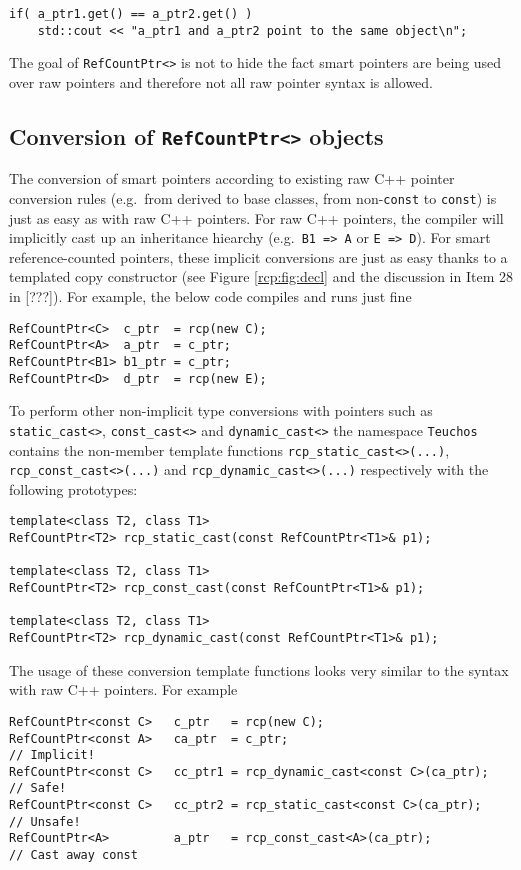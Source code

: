{\scriptsize\begin{verbatim}
if( a_ptr1.get() == a_ptr2.get() )
    std::cout << "a_ptr1 and a_ptr2 point to the same object\n";
\end{verbatim}}

The goal of \texttt{RefCountPtr<>} is not to hide the fact smart
pointers are being used over raw pointers and therefore not all raw
pointer syntax is allowed.

%
\subsection{Conversion of \texttt{RefCountPtr<>} objects}
%

The conversion of smart pointers according to existing raw C++ pointer
conversion rules (e.g.~from derived to base classes, from
non-\texttt{const} to \texttt{const}) is just as easy as with raw C++
pointers.  For raw C++ pointers, the compiler will implicitly cast up
an inheritance hiearchy (e.g.~\texttt{B1 => A} or \texttt{E => D}).
For smart reference-counted pointers, these implicit conversions are
just as easy thanks to a templated copy constructor (see Figure
\ref{rcp:fig:decl} and the discussion in Item 28 in [???]).  For
example, the below code compiles and runs just fine
%
{\scriptsize\begin{verbatim}
RefCountPtr<C>  c_ptr  = rcp(new C);
RefCountPtr<A>  a_ptr  = c_ptr;
RefCountPtr<B1> b1_ptr = c_ptr;
RefCountPtr<D>  d_ptr  = rcp(new E);
\end{verbatim}}
%
To perform other non-implicit type conversions with pointers such as
\texttt{static\-\_cast<>}, \texttt{const\-\_cast<>} and
\texttt{dynamic\-\_cast<>} the namespace \texttt{Teuchos} contains the
non-member template functions \texttt{rcp\-\_static\-\_cast<>(...)},
\texttt{rcp\-\_const\-\_cast<>(...)} and
\texttt{rcp\-\_dynamic\-\_cast<>(...)} respectively with the following
prototypes:
%
{\scriptsize\begin{verbatim}
template<class T2, class T1>
RefCountPtr<T2> rcp_static_cast(const RefCountPtr<T1>& p1);

template<class T2, class T1>
RefCountPtr<T2> rcp_const_cast(const RefCountPtr<T1>& p1);

template<class T2, class T1>
RefCountPtr<T2> rcp_dynamic_cast(const RefCountPtr<T1>& p1);
\end{verbatim}}
%
The usage of these conversion template functions looks very similar to
the syntax with raw C++ pointers.  For example
%
{\scriptsize\begin{verbatim}
RefCountPtr<const C>   c_ptr   = rcp(new C);
RefCountPtr<const A>   ca_ptr  = c_ptr;                              // Implicit!
RefCountPtr<const C>   cc_ptr1 = rcp_dynamic_cast<const C>(ca_ptr);  // Safe!
RefCountPtr<const C>   cc_ptr2 = rcp_static_cast<const C>(ca_ptr);   // Unsafe!
RefCountPtr<A>         a_ptr   = rcp_const_cast<A>(ca_ptr);          // Cast away const
\end{verbatim}}
